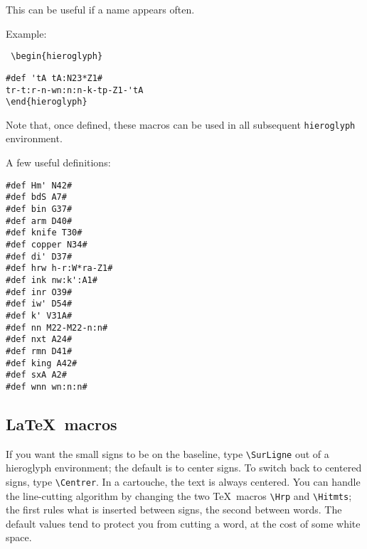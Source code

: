 \documentclass[final]{article}
\begin{document}
This can be useful if a name appears often. 

Example:

\begin{minipage}{15em}
\tt
\noindent\verb|\begin{|hierogl{}yph\verb|}| %
\vspace{-2ex}
\begin{verbatim}
#def 'tA tA:N23*Z1#
tr-t:r-n-wn:n:n-k-tp-Z1-'tA
\end{hieroglyph}
\end{verbatim}
\end{minipage}
\vspace{1ex}

\begin{hieroglyph}{\leavevmode {}\HinterSignsSpace
{}\HinterSignsSpace
{}\HinterSignsSpace
{}\HinterSignsSpace
{}\HinterSignsSpace
{}\HinterSignsSpace
{}\HinterSignsSpace
{}}\end{hieroglyph}
\vspace{1ex}

{\sloppy{} Note that, once defined, these macros can be used in all
  subsequent \verb|hieroglyph| environment.  }
\fussy

A few useful definitions: 
\begin{verbatim}
#def Hm' N42#
#def bdS A7#
#def bin G37#
#def arm D40#
#def knife T30#
#def copper N34#
#def di' D37#
#def hrw h-r:W*ra-Z1#
#def ink nw:k':A1#
#def inr O39#
#def iw' D54#
#def k' V31A#
#def nn M22-M22-n:n#
#def nxt A24#
#def rmn D41#
#def king A42#
#def sxA A2#
#def wnn wn:n:n#
\end{verbatim}

\subsection{\LaTeX\ macros}

If you want the small signs to be on the baseline, type
\verb|\SurLigne| out of a hieroglyph environment; the default is to
center signs. To switch back to centered signs, type \verb|\Centrer|.
In a cartouche, the text is always centered. You can handle the
line-cutting algorithm by changing the two \TeX\ macros
\verb|\Hrp| and \verb|\Hitmts|; the first rules what is
inserted between signs, the second between words.  The default values
tend to protect you from cutting a word, at the cost of some white
space.
\end{document}
